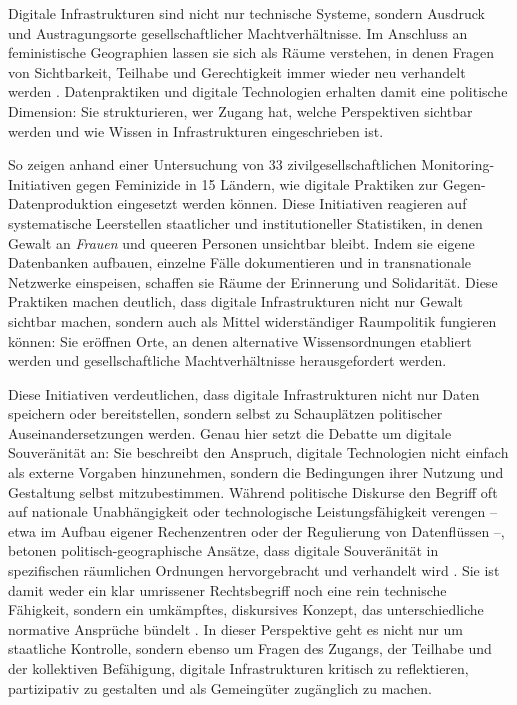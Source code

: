 \vspace{1em}

Digitale Infrastrukturen sind nicht nur technische Systeme, sondern Ausdruck und Austragungsorte gesellschaftlicher Machtverhältnisse. Im Anschluss an feministische Geographien lassen sie sich als Räume verstehen, in denen Fragen von Sichtbarkeit, Teilhabe und Gerechtigkeit immer wieder neu verhandelt werden \parencite{elwoodFeministDigitalGeographies2018}. Datenpraktiken und digitale Technologien erhalten damit eine politische Dimension: Sie strukturieren, wer Zugang hat, welche Perspektiven sichtbar werden und wie Wissen in Infrastrukturen eingeschrieben ist.

So zeigen \textcite{dignazioGeographiesMissingData2024} anhand einer Untersuchung von 33 zivilgesellschaftlichen Monitoring-Initiativen gegen Feminizide in 15 Ländern, wie digitale Praktiken zur Gegen-Datenproduktion eingesetzt werden können. Diese Initiativen reagieren auf systematische Leerstellen staatlicher und institutioneller Statistiken, in denen Gewalt an \emph{Frauen} und queeren Personen unsichtbar bleibt. Indem sie eigene Datenbanken aufbauen, einzelne Fälle dokumentieren und in transnationale Netzwerke einspeisen, schaffen sie Räume der Erinnerung und Solidarität. Diese Praktiken machen deutlich, dass digitale Infrastrukturen nicht nur Gewalt sichtbar machen, sondern auch als Mittel widerständiger Raumpolitik fungieren können: Sie eröffnen Orte, an denen alternative Wissensordnungen etabliert werden und gesellschaftliche Machtverhältnisse herausgefordert werden.

Diese Initiativen verdeutlichen, dass digitale Infrastrukturen nicht nur Daten speichern oder bereitstellen, sondern selbst zu Schauplätzen politischer Auseinandersetzungen werden. Genau hier setzt die Debatte um digitale Souveränität an: Sie beschreibt den Anspruch, digitale Technologien nicht einfach als externe Vorgaben hinzunehmen, sondern die Bedingungen ihrer Nutzung und Gestaltung selbst mitzubestimmen. Während politische Diskurse den Begriff oft auf nationale Unabhängigkeit oder technologische Leistungsfähigkeit verengen -- etwa im Aufbau eigener Rechenzentren oder der Regulierung von Datenflüssen --, betonen politisch-geographische Ansätze, dass digitale Souveränität in spezifischen räumlichen Ordnungen hervorgebracht und verhandelt wird \parencite{glaszeContestedSpatialitiesDigital2023}. Sie ist damit weder ein klar umrissener Rechtsbegriff noch eine rein technische Fähigkeit, sondern ein umkämpftes, diskursives Konzept, das unterschiedliche normative Ansprüche bündelt \parencite{pohleDigitalSovereignty2020}. In dieser Perspektive geht es nicht nur um staatliche Kontrolle, sondern ebenso um Fragen des Zugangs, der Teilhabe und der kollektiven Befähigung, digitale Infrastrukturen kritisch zu reflektieren, partizipativ zu gestalten und als Gemeingüter zugänglich zu machen.

